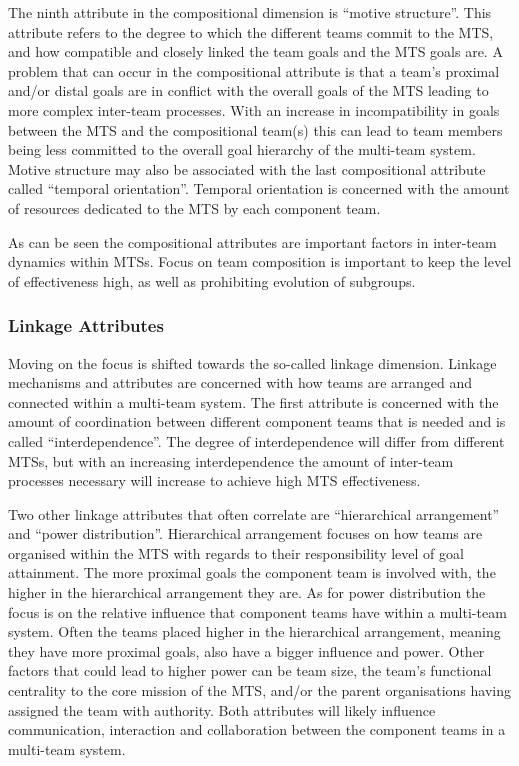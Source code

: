 The ninth attribute in the compositional dimension is ``motive structure''. This attribute refers to the degree to which the different teams commit to the MTS, and how compatible and closely linked the team goals and the MTS goals are. A problem that can occur in the compositional attribute is that a team's proximal and/or distal goals are in conflict with the overall goals of the MTS leading to more complex inter-team processes. With an increase in incompatibility in goals between the MTS and the compositional team(s) this can lead to team members being less committed to the overall goal hierarchy of the multi-team system. Motive structure may also be associated with the last compositional attribute called ``temporal orientation''. Temporal orientation is concerned with the amount of resources dedicated to the MTS by each component team.

As can be seen the compositional attributes are important factors in inter-team dynamics within MTSs. Focus on team composition is important to keep the level of effectiveness high, as well as prohibiting evolution of subgroups.

\subsubsection{Linkage Attributes}

Moving on the focus is shifted towards the so-called linkage dimension. Linkage mechanisms and attributes are concerned with how teams are arranged and connected within a multi-team system. The first attribute is concerned with the amount of coordination between different component teams that is needed and is called ``interdependence''. The degree of interdependence will differ from different MTSs, but with an increasing interdependence the amount of inter-team processes necessary will increase to achieve high MTS effectiveness.

Two other linkage attributes that often correlate are ``hierarchical arrangement'' and ``power distribution''. Hierarchical arrangement focuses on how teams are organised within the MTS with regards to their responsibility level of goal attainment. The more proximal goals the component team is involved with, the higher in the hierarchical arrangement they are. As for power distribution the focus is on the relative influence that component teams have within a multi-team system. Often the teams placed higher in the hierarchical arrangement, meaning they have more proximal goals, also have a bigger influence and power. Other factors that could lead to higher power can be team size, the team's functional centrality to the core mission of the MTS, and/or the parent organisations having assigned the team with authority. Both attributes will likely influence communication, interaction and collaboration between the component teams in a multi-team system.

